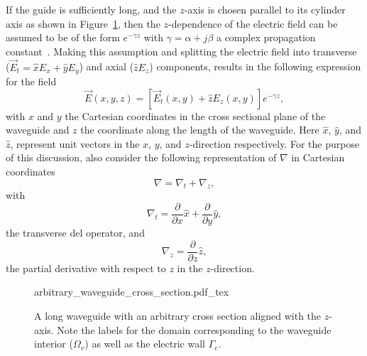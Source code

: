 If the guide is sufficiently long, and the $z$-axis is chosen parallel to its cylinder axis as shown in Figure~\ref{fig:lezar:long_waveguide}, then the $z$-dependence of the electric field can be assumed to be of the form $e^{-\gamma z}$ with $\gamma = \alpha + j\beta$ a complex propagation constant~\citep{PelosiCoccioliSelleri1998, Pozar2005}. Making this assumption and splitting the electric field into transverse ($\vec{E}_t = \hat{x}E_x + \hat{y}E_y$) and axial ($\hat{z}E_z$) components, results in the following expression for the field
\begin{equation}
    \label{eq:lezar:field_components}
    \vec{E}(x,y,z) = [\vec{E}_t(x,y) + \hat{z}E_z(x,y)]e^{-\gamma z},
\end{equation}
with $x$ and $y$ the Cartesian coordinates in the cross sectional plane of the waveguide and $z$ the coordinate along the length of the waveguide. Here $\hat{x}$, $\hat{y}$, and $\hat{z}$, represent unit vectors in the $x$, $y$, and $z$-direction respectively. For the purpose of this discussion, also consider the following representation of $\nabla$ in Cartesian coordinates
\begin{equation}
  \label{eq:lezar:nabla_components}
  \nabla = \nabla_t + \nabla_z,
\end{equation}
with
\begin{equation}
  \nabla_t = \frac{\partial}{\partial x}\hat{x} + \frac{\partial}{\partial y}\hat{y},
\end{equation}
the transverse del operator, and
\begin{equation}
  \nabla_z = \frac{\partial}{\partial z}\hat{z},
\end{equation}
the partial derivative with respect to $z$ in the $z$-direction.

\begin{figure}
 \centering
 \def\svgwidth{\smallfig}
 {arbitrary_waveguide_cross_section.pdf_tex}
 \caption{A long waveguide with an arbitrary cross section aligned with the $z$-axis. Note the labels for the domain corresponding to the waveguide interior ($\Omega_v$) as well as the electric wall $\Gamma_e$.}
 \label{fig:lezar:long_waveguide}
\end{figure}

